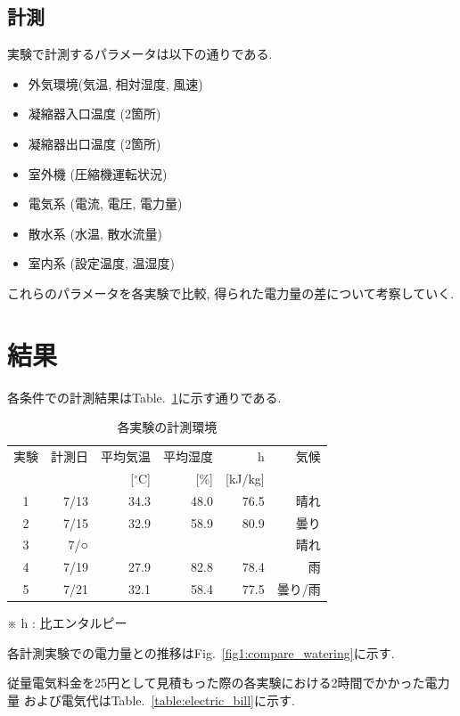 \documentclass[a4j,fleqn,dvipdfmx,uplatex]{jsarticle}
\newcommand{\figref}[1]{Fig.\ \ref{#1}}
\newcommand{\tableref}[1]{Table.\ \ref{#1}}
\begin{document}
\subsection{計測}
実験で計測するパラメータは以下の通りである. 

\begin{itemize}
  \item 外気環境(気温, 相対湿度, 風速)
  \item 凝縮器入口温度 (2箇所)
  \item 凝縮器出口温度 (2箇所)
  \item 室外機 (圧縮機運転状況)
  \item 電気系 (電流, 電圧, 電力量)
  \item 散水系 (水温, 散水流量)
  \item 室内系 (設定温度, 温湿度)
\end{itemize}

これらのパラメータを各実験で比較, 得られた電力量の差について考察していく. 

\section{結果}\label{sec3}
各条件での計測結果は\tableref{table:ex}に示す通りである. 

\begin{table}[htb]
  \caption{各実験の計測環境}
  \label{table:ex}
  \centering
  \begin{tabular}{crrrrr}
    \small 実験 & \small 計測日 & \small 平均気温 & \small 平均湿度 & \small h & \small 気候 \\[-1.5mm]
     & & \small [$^\circ$C] & \small [\%] & \small [kJ/kg] &  \\
    \hline \hline
    1 & 7/13 & 34.3 & 48.0 & 76.5 & 晴れ  \\
    2 & 7/15 & 32.9 & 58.9 & 80.9 & 曇り \\
    3 & 7/○ &  &  &  & 晴れ \\
    4 & 7/19 & 27.9 & 82.8 & 78.4 & 雨 \\
    5 & 7/21 & 32.1 & 58.4 & 77.5 & 曇り/雨 \\
    \hline
  \end{tabular}
    \small ※ h : 比エンタルピー
\end{table}

各計測実験での電力量との推移は\figref{fig1:compare_watering}に示す. 

従量電気料金を25円として見積もった際の各実験における2時間でかかった電力量
および電気代は\tableref{table:electric_bill}に示す. 
\end{document}
